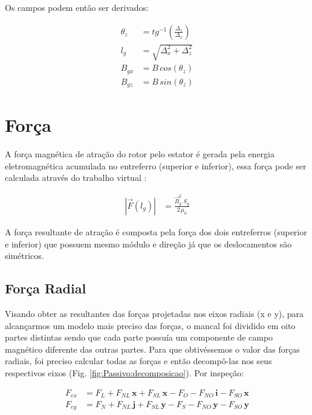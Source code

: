 Os campos podem então ser derivados:

\begin{align}
\theta_z &= tg^{-1}(\frac{\Delta_z}{\Delta_x}) \\
l_g &= \sqrt{\Delta_x^2 + \Delta_z^2} \\
B_{gx} &= B \, cos(\theta_z) \\
B_{gz} &= B \, sin(\theta_z) 
\end{align}


\section{Força}

A força magnética de atração do rotor pelo estator é gerada pela energia eletromagnética acumulada no entreferro (superior e inferior), essa força pode ser calculada através do trabalho virtual \citep{Chiba}:

\begin{align}
|\vec{F}(l_g)| &=  \frac{ \vec{B}_{g}^2 \; S_g}{2 \, \mu_0} \label{eq:passivo:Fx}
\end{align}

A força resultante de atração é composta pela força dos dois entreferros (superior e inferior) que possuem mesmo módulo e direção já que os deslocamentos são simétricos. 

\subsection{Força Radial} \label{subsection:forca:x}


Visando obter as resultantes das forças projetadas nos eixos radiais (x e y), para alcançarmos um modelo mais preciso das forças, o mancal foi dividido em oito partes distintas sendo que cada parte possuía um componente de campo magnético diferente das outras partes. Para que obtivéssemos o valor das forças radiais, foi preciso calcular todas as forças e então decompô-las nos seus respectivos eixos (Fig. \ref{fig:Passivo:decomposicao}). Por inspeção:

\begin{align}
F_{ex} &= F_{L} + F_{NL} \, \boldsymbol{x} + F_{SL} \, \boldsymbol{x} - F_{O} - F_{NO} \, \boldsymbol{i}  - F_{SO} \, \boldsymbol{x} \label{eq:p:F:resultante:x} \\
F_{ey} &= F_{N} + F_{NL} \, \boldsymbol{j} + F_{SL} \, \boldsymbol{y} - F_{S} - F_{NO} \, \boldsymbol{y}  - F_{SO} \, \boldsymbol{y}
\label{eq:p:F:resultante:y} 
\end{align}

